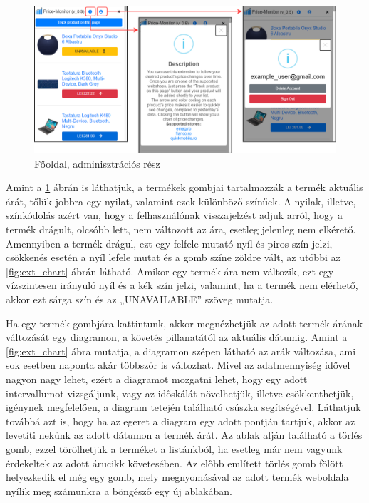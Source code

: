 \begin{figure}[H]
    \centering
    \includegraphics[scale=1.15]{figures/images/home_info_user.png}
    \caption{Főoldal, adminisztrációs rész}
    \label{fig:ext_homescreen_info_user}
\end{figure}

Amint a \ref{fig:ext_homescreen_info_user} ábrán is láthatjuk, a termékek gombjai tartalmazzák a termék aktuális árát, tőlük jobbra egy nyilat, valamint ezek különböző színűek. A nyilak, illetve, színkódolás azért van, hogy a felhasználónak visszajelzést adjuk arról, hogy a termék drágult, olcsóbb lett, nem változott az ára, esetleg jelenleg nem elkérető. Amennyiben a termék drágul, ezt egy felfele mutató nyíl és piros szín jelzi, csökkenés esetén a nyíl lefele mutat és a gomb színe zöldre vált, az utóbbi az \ref{fig:ext_chart} ábrán látható. Amikor egy termék ára nem változik, ezt egy vízszintesen irányuló nyíl és a kék szín jelzi, valamint, ha a termék nem elérhető, akkor ezt sárga szín és az „UNAVAILABLE” szöveg mutatja.

Ha egy termék gombjára kattintunk, akkor megnézhetjük az adott termék árának változását egy diagramon, a követés pillanatától az aktuális dátumig. Amint a \ref{fig:ext_chart} ábra mutatja, a diagramon szépen látható az arák változása, ami sok esetben naponta akár többször is változhat. Mivel az adatmennyiség idővel nagyon nagy lehet, ezért a diagramot mozgatni lehet, hogy egy adott intervallumot vizsgáljunk, vagy az időskálát növelhetjük, illetve csökkenthetjük, igénynek megfelelően, a diagram tetején található csúszka segítségével. Láthatjuk továbbá azt is, hogy ha az egeret a diagram egy adott pontján tartjuk, akkor az levetíti nekünk az adott dátumon a termék árát. Az ablak alján található a törlés gomb, ezzel törölhetjük a terméket a listánkból, ha esetleg már nem vagyunk érdekeltek az adott árucikk követesében. Az előbb említett törlés gomb fölött helyezkedik el még egy gomb, mely megnyomásával az adott termék weboldala nyílik meg számunkra a böngésző egy új ablakában.

